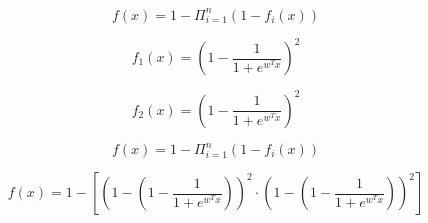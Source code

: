 \documentclass{article}
\begin{document}
\begin{equation}
f(x)=1-\Pi_{i=1}^n(1-f_i(x))
\end{equation}

\begin{equation}
f_1(x) = (1-\frac{1}{1+e^{w^T x}})^2
\end{equation}

\begin{equation}
f_2(x) = (1-\frac{1}{1+e^{w^T x}})^2
\end{equation}

\begin{equation}
f(x)=1-\Pi_{i=1}^n(1-f_i(x))
\end{equation}

\begin{equation}
f(x)=1-[(1-(1-\frac{1}{1+e^{w^T x}}))^2 \cdot (1-(1-\frac{1}{1+e^{w^T x}}))^2]
\end{equation}
\end{document}
